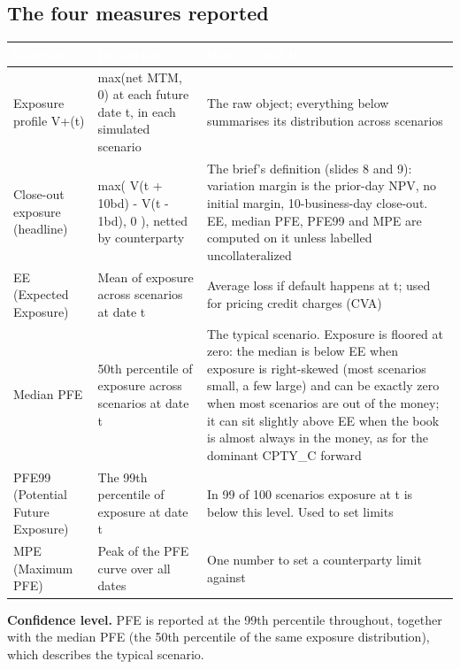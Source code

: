 \documentclass[11pt,letterpaper]{article}
\begin{document}
\subsection{The four measures reported}
{\footnotesize\setlength{\LTpre}{4pt}\setlength{\LTpost}{6pt}
\begin{longtable}{>{\raggedright\arraybackslash}p{}>{\raggedright\arraybackslash}p{}>{\raggedright\arraybackslash}p{}}
\toprule
\rowcolor{navy}\textbf{\textcolor{white}{Measure}} & \textbf{\textcolor{white}{Definition}} & \textbf{\textcolor{white}{How to read it}} \\
\endhead
Exposure profile V+(t) & max(net MTM, 0) at each future date t, in each simulated scenario & The raw object; everything below summarises its distribution across scenarios \\
\rowcolor{gray!9}Close-out exposure (headline) & max( V(t + 10bd) - V(t - 1bd), 0 ), netted by counterparty & The brief's definition (slides 8 and 9): variation margin is the prior-day NPV, no initial margin, 10-business-day close-out. EE, median PFE, PFE99 and MPE are computed on it unless labelled uncollateralized \\
EE (Expected Exposure) & Mean of exposure across scenarios at date t & Average loss if default happens at t; used for pricing credit charges (CVA) \\
\rowcolor{gray!9}Median PFE & 50th percentile of exposure across scenarios at date t & The typical scenario. Exposure is floored at zero: the median is below EE when exposure is right-skewed (most scenarios small, a few large) and can be exactly zero when most scenarios are out of the money; it can sit slightly above EE when the book is almost always in the money, as for the dominant CPTY\_C forward \\
PFE99 (Potential Future Exposure) & The 99th percentile of exposure at date t & In 99 of 100 scenarios exposure at t is below this level. Used to set limits \\
\rowcolor{gray!9}MPE (Maximum PFE) & Peak of the PFE curve over all dates & One number to set a counterparty limit against \\
\bottomrule
\end{longtable}}

\textbf{Confidence level.} PFE is reported at the 99th percentile throughout, together with the median PFE (the 50th percentile of the same exposure distribution), which describes the typical scenario.
\end{document}
